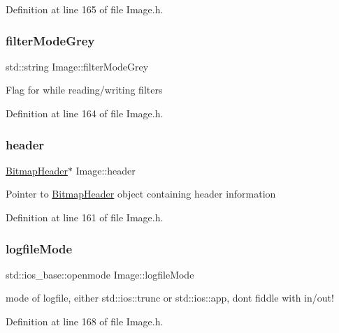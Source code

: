 Definition at line 165 of file Image.\+h.

\mbox{\label{classImage_aa05610d5ebee3b0fce0463d2a0b1323f}} 
\subsubsection{\texorpdfstring{filterModeGrey}{filterModeGrey}}
{\footnotesize\ttfamily std\+::string Image\+::filter\+Mode\+Grey\hspace{0.3cm}{\ttfamily [protected]}}

Flag for while reading/writing filters 

Definition at line 164 of file Image.\+h.

\mbox{\label{classImage_adaf72c2df8979eafb4031dc0384dc49f}} 
\subsubsection{\texorpdfstring{header}{header}}
{\footnotesize\ttfamily \mbox{\hyperlink{classBitmapHeader}{Bitmap\+Header}}$\ast$ Image\+::header\hspace{0.3cm}{\ttfamily [protected]}}

Pointer to \mbox{\hyperlink{classBitmapHeader}{Bitmap\+Header}} object containing header information 

Definition at line 161 of file Image.\+h.

\mbox{\label{classImage_a992bf12c3ed95761bf6854922f26226a}} 
\subsubsection{\texorpdfstring{logfileMode}{logfileMode}}
{\footnotesize\ttfamily std\+::ios\+\_\+base\+::openmode Image\+::logfile\+Mode\hspace{0.3cm}{\ttfamily [protected]}}

mode of logfile, either std\+::ios\+::trunc or std\+::ios\+::app, dont fiddle with in/out! 

Definition at line 168 of file Image.\+h.

\mbox{\label{classImage_a6243d547194695512738b9606a9e081a}} 
